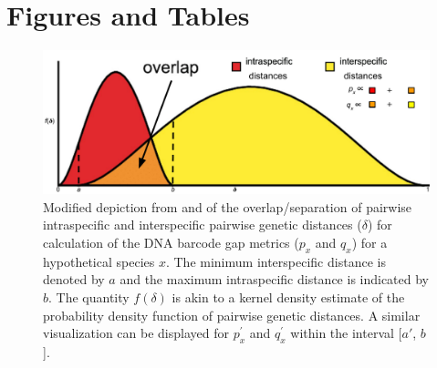 \documentclass[12pt]{article}
\begin{document}
\newpage

\section*{Figures and Tables}

\begin{figure}[H]

\centering

\includegraphics[width=1.0\textwidth]{Figure 1}

\caption{Modified depiction from \citet{meyer2005dna} and \citet{phillips2024measure} of the overlap/separation of pairwise intraspecific and interspecific pairwise genetic distances ($\delta$) for calculation of the DNA barcode gap metrics ($p_x$ and $q_x$) for a hypothetical species $x$. The minimum interspecific distance is denoted by $a$ and the maximum intraspecific distance is indicated by $b$. The quantity $f(\delta)$ is akin to a kernel density estimate of the probability density function of pairwise genetic distances. A similar visualization can be displayed for $p^{'}_x$ and $q^{'}_x$ within the interval [$a'$, $b$].}

\end{figure}

\newpage
\end{document}
